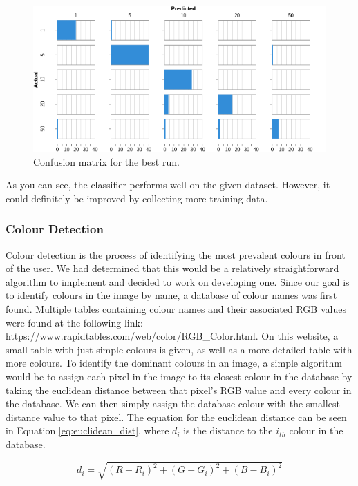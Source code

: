 \documentclass[a4paper,11pt]{article}
\begin{document}
\begin{figure}[H]
\centering
\includegraphics[scale=0.75]{img/cv_appendix/best_run_conf_matrix.png}
\caption{Confusion matrix for the best run.}
\label{fig:conf_matrix}
\end{figure}

As you can see, the classifier performs well on the given dataset. However, it could definitely be improved by collecting more training data.

\subsubsection{Colour Detection}
Colour detection is the process of identifying the most prevalent colours in front of the user. We had determined that this would be a relatively straightforward algorithm to implement and decided to work on developing one. Since our goal is to identify colours in the image by name, a database of colour names was first found. Multiple tables containing colour names and their associated RGB values were found at the following link: https://www.rapidtables.com/web/color/RGB\_Color.html. On this website, a small table with just simple colours is given, as well as a more detailed table with more colours. To identify the dominant colours in an image, a simple algorithm would be to assign each pixel in the image to its closest colour in the database by taking the euclidean distance between that pixel's RGB value and every colour in the database. We can then simply assign the database colour with the smallest distance value to that pixel. The equation for the euclidean distance can be seen in Equation \ref{eq:euclidean_dist}, where $d_i$ is the distance to the $i_{th}$ colour in the database. 

\begin{equation}
\label{eq:euclidean_dist}
d_i=\sqrt{(R - R_i)^2 + (G - G_i)^2 + (B - B_i)^2}
\end{equation}
\end{document}

